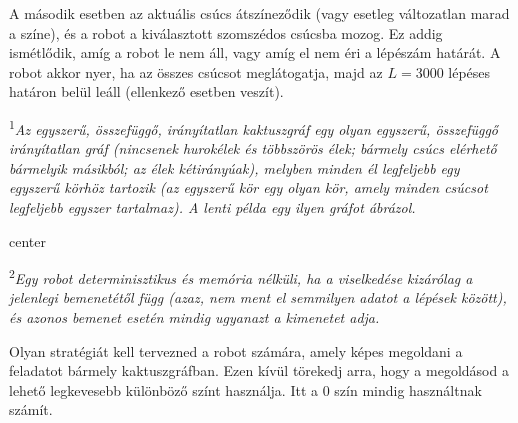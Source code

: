 \documentclass[12pt]{article}
\begin{document}
A második esetben az aktuális csúcs átszíneződik (vagy esetleg változatlan marad a színe), és a robot a kiválasztott szomszédos csúcsba mozog. Ez addig ismétlődik, amíg a robot le nem áll, vagy amíg el nem éri a lépészám határát. A robot akkor nyer, ha az összes csúcsot meglátogatja, majd az $L = 3000$ lépéses határon belül leáll (ellenkező esetben veszít).


\textsuperscript{1}\textit{Az egyszerű, összefüggő, irányítatlan kaktuszgráf egy olyan egyszerű, összefüggő irányítatlan gráf (nincsenek hurokélek és többszörös élek; bármely csúcs elérhető bármelyik másikból; az élek kétirányúak), melyben minden él legfeljebb egy egyszerű körhöz tartozik (az egyszerű kör egy olyan kör, amely minden csúcsot legfeljebb egyszer tartalmaz). A lenti példa egy ilyen gráfot ábrázol.}

\begin{adjustbox}{center}
	
\end{adjustbox}

\textsuperscript{2}\textit{Egy robot determinisztikus és memória nélküli, ha a viselkedése kizárólag a jelenlegi bemenetétől függ (azaz, nem ment el semmilyen adatot a lépések között), és azonos bemenet esetén mindig ugyanazt a kimenetet adja.}

Olyan stratégiát kell tervezned a robot számára, amely képes megoldani a feladatot bármely kaktuszgráfban. Ezen kívül törekedj arra, hogy a megoldásod a lehető legkevesebb különböző színt használja. Itt a 0 szín mindig használtnak számít.
\end{document}
